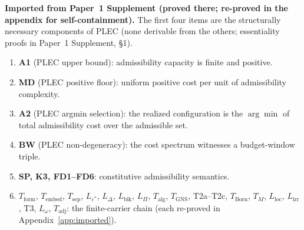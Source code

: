\documentclass[11pt]{article}
\theoremstyle{definition}
\newcommand{\eps}{\varepsilon}
\begin{document}
\medskip
\begin{tcolorbox}[apfbox, title={What Is Assumed, What Is Proved, What Is Deferred}]

\textbf{Imported from Paper~1 Supplement (proved there; re-proved in the appendix for self-containment).}  The first four items are the structurally necessary components of PLEC (none derivable from the others; essentiality proofs in Paper~1 Supplement, \S1).
\begin{enumerate}[nosep,label=\arabic*.,leftmargin=2em]
  \item \textbf{A1} (PLEC upper bound): admissibility capacity is finite and positive.
  \item \textbf{MD} (PLEC positive floor): uniform positive cost per unit of admissibility complexity.
  \item \textbf{A2} (PLEC argmin selection): the realized configuration is the $\arg\min$ of total admissibility cost over the admissible set.
  \item \textbf{BW} (PLEC non-degeneracy): the cost spectrum witnesses a budget-window triple.
  \item \textbf{SP, K3, FD1--FD6}: constitutive admissibility semantics.
  \item $T_{\mathrm{form}}$, $T_{\mathrm{embed}}$, $T_{\mathrm{sep}}$, $L_{\eps^*}$, $L_\Delta$, $L_{\mathrm{blk}}$, $L_\Pi$, $T_{\mathrm{alg}}$, $T_{\mathrm{GNS}}$, T2a--T2c, $T_{\mathrm{Born}}$, $T_M$, $L_{\mathrm{loc}}$, $L_{\mathrm{irr}}$, T3, $L_\omega$, $T_{\mathrm{adj}}$: the finite-carrier chain (each re-proved in Appendix~\ref{app:imported}).
\end{enumerate}


\end{tcolorbox}
\end{document}
